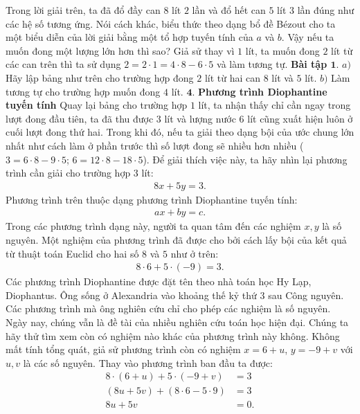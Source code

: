 \begin{multicols}{2}
	Trong lời giải trên, ta đã đổ đầy can $8$ lít $2$ lần và đổ hết can $5$ lít $3$ lần đúng như các hệ số tương ứng. Nói cách khác, biểu thức theo dạng bổ đề Bézout cho ta một biểu diễn của lời giải bằng một tổ hợp tuyến tính của $a$ và $b$.
	\vskip 0.1cm
	Vậy nếu ta muốn đong một lượng lớn hơn thì sao? Giả sử thay vì $1$ lít, ta muốn đong $2$ lít từ các can trên thì ta sử dụng $2=2\cdot 1=4\cdot 8-6\cdot 5$ và làm tương tự.
	\vskip 0.1cm
	\textbf{\color{hoccungpi}Bài tập $\pmb{1.}$}
	$a)$ Hãy lập bảng như trên cho trường hợp đong $2$ lít từ hai can $8$ lít và $5$ lít.
	\vskip 0.1cm
	$b)$ Làm tương tự cho trường hợp muốn đong $4$ lít.
	\vskip 0.1cm
	$\pmb{4.}$ \textbf{\color{hoccungpi}Phương trình Diophantine tuyến tính}
	\vskip 0.1cm
	Quay lại bảng cho trường hợp $1$ lít, ta nhận thấy chỉ cần ngay trong lượt đong đầu tiên, ta đã thu được $3$ lít và lượng nước 6 lít cũng xuất hiện luôn ở cuối lượt đong thứ hai. Trong khi đó, nếu ta giải theo dạng bội của ước chung lớn nhất như cách làm ở phần trước thì số lượt đong sẽ nhiều hơn nhiều ($3=6\cdot 8-9\cdot 5$; $6=12\cdot 8-18\cdot 5$).
	\vskip 0.1cm
	Để giải thích việc này, ta hãy nhìn lại phương trình cần giải cho trường hợp $3$ lít:
	\begin{align*}
		8x+5y=3.	\tag{$4$}
	\end{align*}
	Phương trình trên thuộc dạng phương trình Diophantine tuyến tính: 
	\begin{align*}
		ax+by=c.
	\end{align*}
	Trong các phương trình dạng này, người ta quan tâm đến các nghiệm $x,y$ là số nguyên. Một nghiệm của phương trình đã được cho bởi cách lấy bội của kết quả từ thuật toán Euclid cho hai số $8$ và $5$ như ở trên:
	\begin{align*}
		8\cdot 6+5\cdot (-9)=3.
	\end{align*}
	Các phương trình Diophantine được đặt tên theo nhà toán học Hy Lạp, Diophantus. Ông sống ở Alexandria vào khoảng thế kỷ thứ $3$ sau Công nguyên. Các phương trình mà ông nghiên cứu chỉ cho phép các nghiệm là số nguyên. Ngày nay, chúng vẫn là đề tài của nhiều nghiên cứu toán học hiện đại.
	\vskip 0.1cm
	Chúng ta hãy thử tìm xem còn có nghiệm nào khác của phương trình này không. Không mất tính tổng quát, giả sử phương trình còn có nghiệm $x=6+u$, $y=-9+v$ với $u,v$ là các số nguyên. Thay vào phương trình ban đầu ta được:
	\begin{align*}
		8\cdot (6+u)+5\cdot (-9+v)&=3\\
		(8u+5v)+(8\cdot 6-5\cdot 9)&=3\\
		8u+5v&=0.		\tag{$5$}

\end{align*}
\end{multicols}
